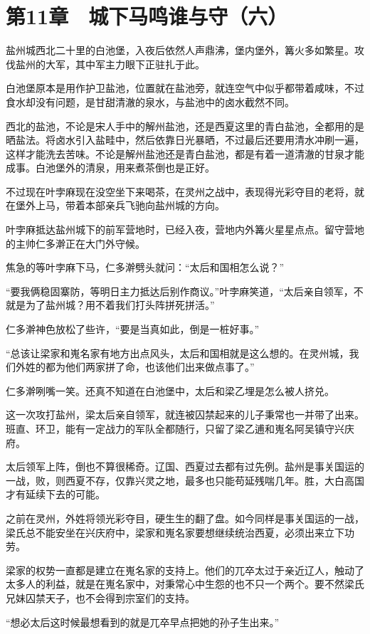 \section{第11章　城下马鸣谁与守（六）}

盐州城西北二十里的白池堡，入夜后依然人声鼎沸，堡内堡外，篝火多如繁星。攻伐盐州的大军，其中军主力眼下正驻扎于此。

白池堡原本是用作护卫盐池，位置就在盐池旁，就连空气中似乎都带着咸味，不过食水却没有问题，是甘甜清澈的泉水，与盐池中的卤水截然不同。

西北的盐池，不论是宋人手中的解州盐池，还是西夏这里的青白盐池，全都用的是晒盐法。将卤水引入盐畦中，然后依靠日光暴晒，不过最后还要用清水冲刷一遍，这样才能洗去苦味。不论是解州盐池还是青白盐池，都是有着一道清澈的甘泉才能成事。白池堡外的清泉，用来煮茶倒也是正好。

不过现在叶孛麻现在没空坐下来喝茶，在灵州之战中，表现得光彩夺目的老将，就在堡外上马，带着本部亲兵飞驰向盐州城的方向。

叶孛麻抵达盐州城下的前军营地时，已经入夜，营地内外篝火星星点点。留守营地的主帅仁多澣正在大门外守候。

焦急的等叶孛麻下马，仁多澣劈头就问：“太后和国相怎么说？”

“要我俩稳固寨防，等明日主力抵达后别作商议。”叶孛麻笑道，“太后亲自领军，不就是为了盐州城？用不着我们打头阵拼死拼活。”

仁多澣神色放松了些许，“要是当真如此，倒是一桩好事。”

“总该让梁家和嵬名家有地方出点风头，太后和国相就是这么想的。在灵州城，我们外姓的都为他们两家拼了命，也该他们出来做点事了。”

仁多澣咧嘴一笑。还真不知道在白池堡中，太后和梁乙埋是怎么被人挤兑。

这一次攻打盐州，梁太后亲自领军，就连被囚禁起来的儿子秉常也一并带了出来。班直、环卫，能有一定战力的军队全都随行，只留了梁乙逋和嵬名阿吴镇守兴庆府。

太后领军上阵，倒也不算很稀奇。辽国、西夏过去都有过先例。盐州是事关国运的一战，败，则西夏不存，仅靠兴灵之地，最多也只能苟延残喘几年。胜，大白高国才有延续下去的可能。

之前在灵州，外姓将领光彩夺目，硬生生的翻了盘。如今同样是事关国运的一战，梁氏总不能安坐在兴庆府中，梁家和嵬名家要想继续统治西夏，必须出来立下功劳。

梁家的权势一直都是建立在嵬名家的支持上。他们的兀卒太过于亲近辽人，触动了太多人的利益，就是在嵬名家中，对秉常心中生怨的也不只一个两个。要不然梁氏兄妹囚禁天子，也不会得到宗室们的支持。

“想必太后这时候最想看到的就是兀卒早点把她的孙子生出来。”


